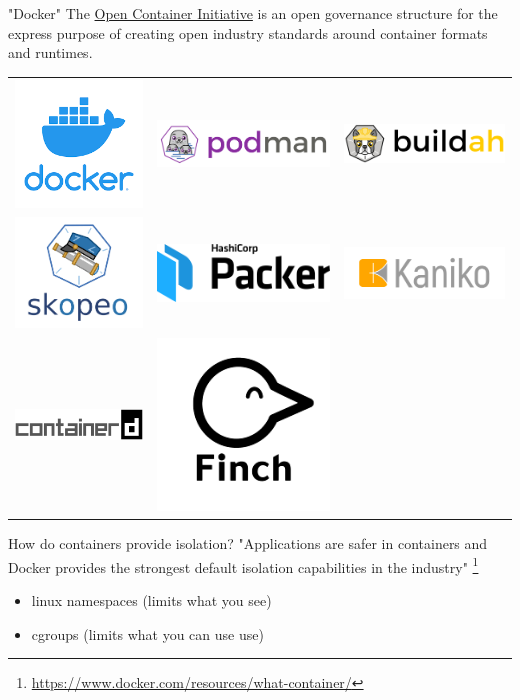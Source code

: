 \documentclass[
  english,          
  aspectratio=169,    %
]{tumbeamer}
\begin{document}
\begin{frame}{"Docker"}
The \href{https://opencontainers.org/}{Open Container Initiative} is an open governance structure for the express purpose of creating open industry standards around container formats and runtimes.
\centering \begin{tabular}{ccc}
\includegraphics[width=.1\linewidth]{docker.png} & 
\includegraphics[width=.2\linewidth]{podman.png} & 
\includegraphics[width=.2\linewidth]{buildah.png}\\
\includegraphics[width=.2\linewidth]{skopeo.png} &
\includegraphics[width=.2\linewidth]{packer.png} &
\includegraphics[width=.2\linewidth]{kaniko.png}\\
\includegraphics[width=.2\linewidth]{containerd.png} & 
\includegraphics[width=.1\linewidth]{finch.png} & 
\end{tabular}
\end{frame}

\begin{frame}{How do containers provide isolation?}
"Applications are safer in containers and Docker provides the strongest default isolation capabilities in the industry" \footnote{\href{https://www.docker.com/resources/what-container/}{https://www.docker.com/resources/what-container/}}
\vspace{15mm}
\begin{itemize}
    \item linux namespaces (limits what you see)
    \item cgroups (limits what you can use use)
\end{itemize}
\end{frame}
\end{document}
